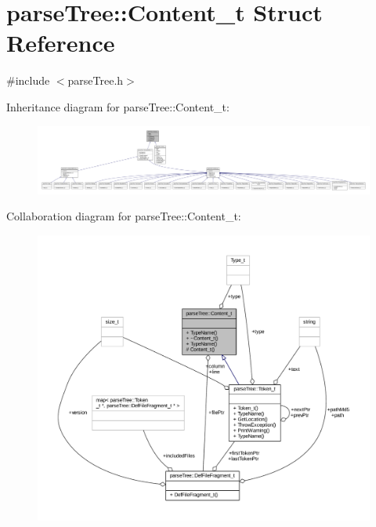 \hypertarget{structparse_tree_1_1_content__t}{}\section{parse\+Tree\+:\+:Content\+\_\+t Struct Reference}
\label{structparse_tree_1_1_content__t}


{\ttfamily \#include $<$parse\+Tree.\+h$>$}



Inheritance diagram for parse\+Tree\+:\+:Content\+\_\+t\+:
\nopagebreak
\begin{figure}[H]
\begin{center}
\leavevmode
\includegraphics[width=350pt]{structparse_tree_1_1_content__t__inherit__graph}
\end{center}
\end{figure}


Collaboration diagram for parse\+Tree\+:\+:Content\+\_\+t\+:
\nopagebreak
\begin{figure}[H]
\begin{center}
\leavevmode
\includegraphics[width=350pt]{structparse_tree_1_1_content__t__coll__graph}
\end{center}
\end{figure}
